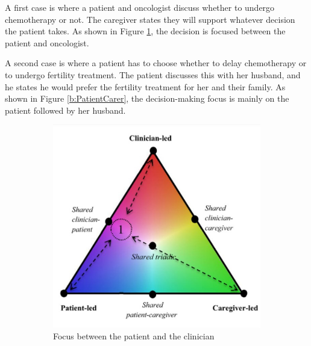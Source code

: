 \documentclass{sigchi}
\begin{document}
A first case is where a patient and oncologist discuss whether to undergo chemotherapy or not. The caregiver states they will support whatever decision the patient takes. As shown in Figure  \ref{a:PatientClinician}, the decision is focused between the patient and oncologist.

A second case is where a patient has to choose whether to delay chemotherapy or to undergo fertility treatment. The patient discusses this with her husband, and he states he would prefer the fertility treatment for her and their family. As shown in Figure \ref{b:PatientCarer}, the decision-making focus is mainly on the patient followed by her husband.

\raggedbottom


\begin{figure} [H]
\begin{subfigure}{.45\columnwidth}
  \centering
  \includegraphics[width=1\columnwidth]{figures/Triangle1Screenshot.jpg}
  \caption{Focus between the patient and the clinician}
  \label{a:PatientClinician}
\end{subfigure}%
\hfill
\begin{subfigure}{.45\columnwidth}
  \centering

\end{subfigure}
\end{figure}
\end{document}
